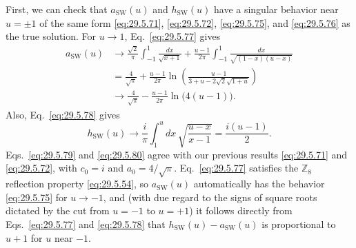 First, we can check that \(a_{\mathrm{SW}}(u)\) and \(h_{\mathrm{SW}}(u)\)
have a singular behavior near \(u=\pm1\) of the same form
\eqref{eq:29.5.71}, \eqref{eq:29.5.72}, \eqref{eq:29.5.75}, and
\eqref{eq:29.5.76} as the true solution. For \(u\longrightarrow1\),
Eq.~\eqref{eq:29.5.77} gives
\begin{equation}
  \begin{aligned}
  a_{\mathrm{SW}}(u)
  &\longrightarrow
  \frac{\sqrt{2}}{\pi}\int_{-1}^{1}\frac{dx}{\sqrt{x+1}}
  +\frac{u-1}{2\pi}\int_{-1}^{1}
    \frac{dx}{\sqrt{(1-x)(u-x)}}
  \\
  &=\frac{4}{\sqrt{\pi}}
  +\frac{u-1}{2\pi}\ln\left(
    \frac{u-1}{3+u-2\sqrt{2}\sqrt{1+u}}
  \right)
  \\
  &\longrightarrow
  \frac{4}{\sqrt{\pi}}-\frac{u-1}{2\pi}\ln\bigl(4(u-1)\bigr).
  \end{aligned}
  \tag{29.5.79}\label{eq:29.5.79}
\end{equation}
Also, Eq.~\eqref{eq:29.5.78} gives
\begin{equation}
  h_{\mathrm{SW}}(u)
  \longrightarrow\frac{i}{\pi}\int_1^u dx\,
  \sqrt{\frac{u-x}{x-1}}
  =\frac{i(u-1)}{2}.
  \tag{29.5.80}\label{eq:29.5.80}
\end{equation}
Eqs.~\eqref{eq:29.5.79} and \eqref{eq:29.5.80} agree with our previous
results \eqref{eq:29.5.71} and \eqref{eq:29.5.72}, with \(c_0=i\) and
\(a_0=4/\sqrt{\pi}\). Eq.~\eqref{eq:29.5.77} satisfies the
\(\mathbb{Z}_8\) reflection property \eqref{eq:29.5.54}, so
\(a_{\mathrm{SW}}(u)\) automatically has the behavior \eqref{eq:29.5.75}
for \(u\longrightarrow-1\), and (with due regard to the signs of square
roots dictated by the cut from \(u=-1\) to \(u=+1\)) it follows directly
from Eqs.~\eqref{eq:29.5.77} and \eqref{eq:29.5.78} that
\(h_{\mathrm{SW}}(u)-a_{\mathrm{SW}}(u)\) is proportional to \(u+1\) for
\(u\) near \(-1\).

